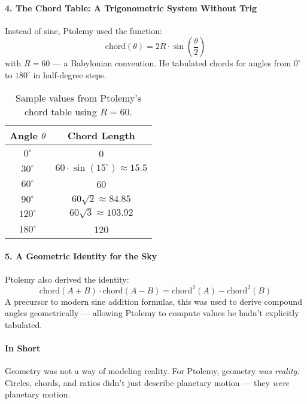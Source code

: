\paragraph{4. The Chord Table: A Trigonometric System Without Trig}

Instead of sine, Ptolemy used the function:
\[
\text{chord}(\theta) = 2R \cdot \sin\left(\frac{\theta}{2}\right)
\]
with \( R = 60 \) — a Babylonian convention. He tabulated chords for angles from \( 0^\circ \) to \( 180^\circ \) in half-degree steps.

\begin{table}[H]
\centering
\begin{tabular}{|c|c|}
\hline
\textbf{Angle \( \theta \)} & \textbf{Chord Length} \\
\hline
\( 0^\circ \) & 0 \\
\( 30^\circ \) & \( 60 \cdot \sin(15^\circ) \approx 15.5 \) \\
\( 60^\circ \) & 60 \\
\( 90^\circ \) & \( 60 \sqrt{2} \approx 84.85 \) \\
\( 120^\circ \) & \( 60 \sqrt{3} \approx 103.92 \) \\
\( 180^\circ \) & 120 \\
\hline
\end{tabular}
\caption{Sample values from Ptolemy’s chord table using \( R = 60 \).}
\end{table}

\paragraph{5. A Geometric Identity for the Sky}

Ptolemy also derived the identity:
\[
\text{chord}(A + B) \cdot \text{chord}(A - B) = \text{chord}^2(A) - \text{chord}^2(B)
\]
A precursor to modern sine addition formulas, this was used to derive compound angles geometrically — allowing Ptolemy to compute values he hadn't explicitly tabulated.

\paragraph{In Short}

Geometry was not a way of modeling reality. For Ptolemy, geometry \textit{was reality}. Circles, chords, and ratios didn’t just describe planetary motion — they \textit{were} planetary motion.


